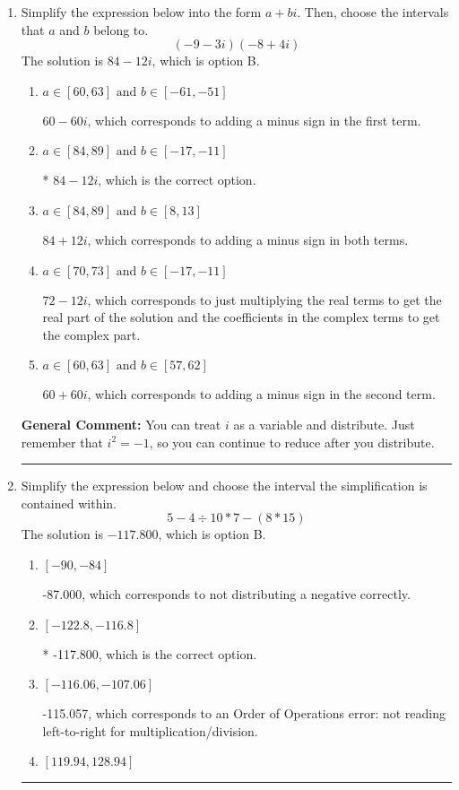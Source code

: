 \documentclass{extbook}[14pt]
\newcommand{\litem}[1]{\item #1

\rule{\textwidth}{0.4pt}}
\begin{document}
\begin{enumerate}\litem{
Simplify the expression below into the form $a+bi$. Then, choose the intervals that $a$ and $b$ belong to.
\[ (-9 - 3 i)(-8 + 4 i) \]
The solution is \( 84 - 12 i \), which is option B.\begin{enumerate}[label=\Alph*.]
\item \( a \in [60, 63] \text{ and } b \in [-61, -51] \)

 $60 - 60 i$, which corresponds to adding a minus sign in the first term.
\item \( a \in [84, 89] \text{ and } b \in [-17, -11] \)

* $84 - 12 i$, which is the correct option.
\item \( a \in [84, 89] \text{ and } b \in [8, 13] \)

 $84 + 12 i$, which corresponds to adding a minus sign in both terms.
\item \( a \in [70, 73] \text{ and } b \in [-17, -11] \)

 $72 - 12 i$, which corresponds to just multiplying the real terms to get the real part of the solution and the coefficients in the complex terms to get the complex part.
\item \( a \in [60, 63] \text{ and } b \in [57, 62] \)

 $60 + 60 i$, which corresponds to adding a minus sign in the second term.
\end{enumerate}

\textbf{General Comment:} You can treat $i$ as a variable and distribute. Just remember that $i^2=-1$, so you can continue to reduce after you distribute.
}
\litem{
Simplify the expression below and choose the interval the simplification is contained within.
\[ 5 - 4 \div 10 * 7 - (8 * 15) \]
The solution is \( -117.800 \), which is option B.\begin{enumerate}[label=\Alph*.]
\item \( [-90, -84] \)

 -87.000, which corresponds to not distributing a negative correctly.
\item \( [-122.8, -116.8] \)

* -117.800, which is the correct option.
\item \( [-116.06, -107.06] \)

 -115.057, which corresponds to an Order of Operations error: not reading left-to-right for multiplication/division.
\item \( [119.94, 128.94] \)


\end{enumerate}}
\end{enumerate}
\end{document}
